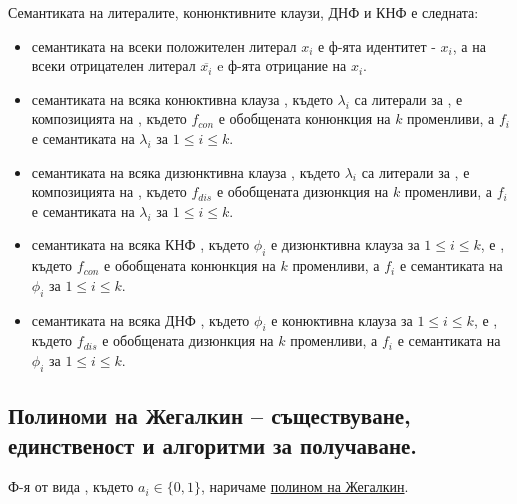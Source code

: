 \begin{note}
    Семантиката на литералите, конюнктивните клаузи, ДНФ и КНФ е следната:
    \begin{itemize}
        \item семантиката на всеки положителен литерал \(x_i\) е ф-ята идентитет - \(x_i\), а на всеки 
        отрицателен литерал \(\overline{x_i}\) e ф-ята отрицание на \(x_i\).
        \item семантиката на всяка конюктивна клауза , където 
        \(\lambda_i\) са литерали за , е композицията на , 
        където \(f_{con}\) е обобщената конюнкция на \(k\) променливи, а \(f_i\) е семантиката на \(\lambda_i\) за 
        \(1 \le i \le k\).
        \item семантиката на всяка дизюнктивна клауза , 
        където \(\lambda_i\) са литерали за , е композицията на 
        , където \(f_{dis}\) е обобщената дизюнкция на \(k\) променливи, 
        а \(f_i\) е семантиката на \(\lambda_i\) за \(1 \le i \le k\).
        \item семантиката на всяка КНФ , където 
        \(\phi_i\) е дизюнктивна клауза за \(1 \le i \le k\), е , където 
        \(f_{con}\) е обобщената конюнкция на \(k\) променливи, а \(f_i\) е семантиката на \(\phi_i\) за 
        \(1 \le i \le k\).
        \item семантиката на всяка ДНФ , където 
        \(\phi_i\) е конюктивна клауза за \(1 \le i \le k\), е , където 
        \(f_{dis}\) е обобщената дизюнкция на \(k\) променливи, а \(f_i\) е семантиката на \(\phi_i\) за 
        \(1 \le i \le k\).
    \end{itemize}
\end{note}

\subsection{Полиноми на Жегалкин – съществуване, единственост и алгоритми за получаване.}

\begin{definition}
    Ф-я от вида , където 
    \(a_i \in \{0, 1\}\), наричаме \underline{полином на Жегалкин}.
\end{definition}

